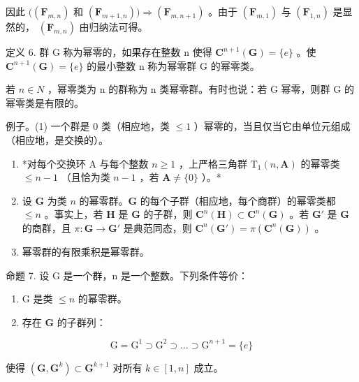 因此 \(((\mathbf{F}_{m,n})\) 和 \((\mathbf{F}_{m + 1,n}))\Rightarrow (\mathbf{F}_{m,n + 1})\) 。由于 \((\mathbf{F}_{m,1})\) 与 \((\mathbf{F}_{1,n})\) 是显然的， \((\mathbf{F}_{m,n})\) 由归纳法可得。

定义 6. 群 G 称为幂零的，如果存在整数 n 使得 \(\mathbf{C}^{n+1}(\mathbf{G}) = \{e\}\) 。使 \(\mathbf{C}^{n+1}(\mathbf{G}) = \{e\}\) 的最小整数 n 称为幂零群 G 的幂零类。

若 \(n \in N\) ，幂零类为 n 的群称为 n 类幂零群。有时也说：若 G 幂零，则群 G 的幂零类是有限的。

例子。(1) 一个群是 0 类（相应地，类 \(\leqslant 1\) ）幂零的，当且仅当它由单位元组成（相应地，是交换的）。

\begin{enumerate}
\def\labelenumi{(\arabic{enumi})}
\setcounter{enumi}{1}
\item
  *对每个交换环 A 与每个整数 \(n \geqslant 1\) ，上严格三角群 \(\mathrm{T}_1(n, \mathbf{A})\) 的幂零类 \(\leqslant n - 1\) （且恰为类 \(n - 1\) ，若 \(\mathbf{A} \neq \{0\}\) ）。*
\item
  设 \(\mathbf{G}\) 为类 \(n\) 的幂零群。\(\mathbf{G}\) 的每个子群（相应地，每个商群）的幂零类都 \(\leqslant n\) 。事实上，若 \(\mathbf{H}\) 是 \(\mathbf{G}\) 的子群，则 \(\mathbf{C}^n (\mathbf{H})\subset \mathbf{C}^n (\mathbf{G})\) 。若 \(\mathbf{G}'\) 是 \(\mathbf{G}\) 的商群，且 \(\pi : \mathbf{G}\to \mathbf{G}'\) 是典范同态，则 \(\mathbf{C}^n (\mathbf{G}') = \pi (\mathbf{C}^n (\mathbf{G}))\) 。
\item
  幂零群的有限乘积是幂零群。
\end{enumerate}

命题 7. 设 G 是一个群，n 是一个整数。下列条件等价：

\begin{enumerate}
\def\labelenumi{(\alph{enumi})}
\item
  G 是类 \(\leqslant n\) 的幂零群。
\item
  存在 \(\mathbf{G}\) 的子群列：
\end{enumerate}

\[
\mathrm{G} = \mathrm{G} ^ {1} \supset \mathrm{G} ^ {2} \supset \dots \supset \mathrm{G} ^ {n + 1} = \{e \}
\]

使得 \((\mathbf{G},\mathbf{G}^k)\subset \mathbf{G}^{k + 1}\) 对所有 \(k\in [1,n]\) 成立。

